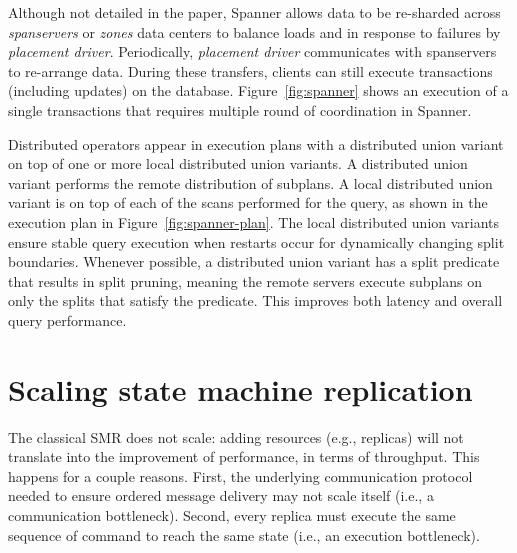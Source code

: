 Although not detailed in the paper, Spanner allows data to be re-sharded across
\emph{spanservers} or \emph{zones} data centers to balance loads and in response
to failures by \emph{placement driver}. Periodically, \emph{placement driver}
communicates with spanservers to re-arrange data. During these transfers,
clients can still execute transactions (including updates) on the database.
Figure~\ref{fig:spanner} shows an execution of a single transactions that
requires multiple round of coordination in Spanner.

Distributed operators appear in execution plans with a distributed union variant
on top of one or more local distributed union variants. A distributed union
variant performs the remote distribution of subplans. A local distributed union
variant is on top of each of the scans performed for the query, as shown in the
execution plan in Figure~\ref{fig:spanner-plan}. The local distributed union
variants ensure stable query execution when restarts occur for dynamically
changing split boundaries. Whenever possible, a distributed union variant has a
split predicate that results in split pruning, meaning the remote servers
execute subplans on only the splits that satisfy the predicate. This improves
both latency and overall query performance.





\section{Scaling state machine replication}

The classical SMR does not scale: adding resources (e.g., replicas) will not
translate into the improvement of performance, in terms of throughput. This
happens for a couple reasons. First, the underlying communication protocol
needed to ensure ordered message delivery may not scale itself (i.e., a
communication bottleneck). Second, every replica must execute the same sequence
of command to reach the same state (i.e., an execution bottleneck).

